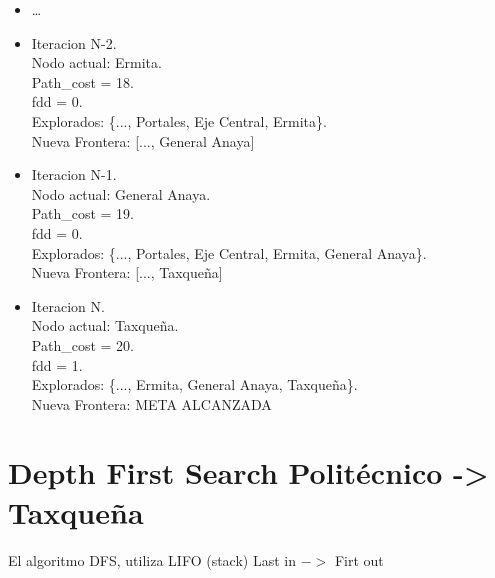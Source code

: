 \documentclass[10pt,a4paper]{article}
\begin{document}
\begin{itemize}
    \item \dots
    
    \item Iteracion N-2.\\
    Nodo actual: Ermita.\\
    Path\_cost = 18.\\
    fdd = 0.\\
    Explorados: \{..., Portales, Eje Central, Ermita\}.\\
    Nueva Frontera: [..., General Anaya]

    \item Iteracion N-1.\\
    Nodo actual: General Anaya.\\
    Path\_cost = 19.\\
    fdd = 0.\\
    Explorados: \{..., Portales, Eje Central, Ermita, General Anaya\}.\\
    Nueva Frontera: [..., Taxqueña]

    \item Iteracion N.\\
    Nodo actual: Taxqueña.\\
    Path\_cost = 20.\\
    fdd = 1.\\
    Explorados: \{..., Ermita, General Anaya, Taxqueña\}.\\
    Nueva Frontera: META ALCANZADA

\end{itemize}

\newpage

\section{Depth First Search Politécnico -> Taxqueña}

\vspace{3mm}

El algoritmo DFS, utiliza LIFO (stack) Last in \(->\) Firt out
\end{document}
